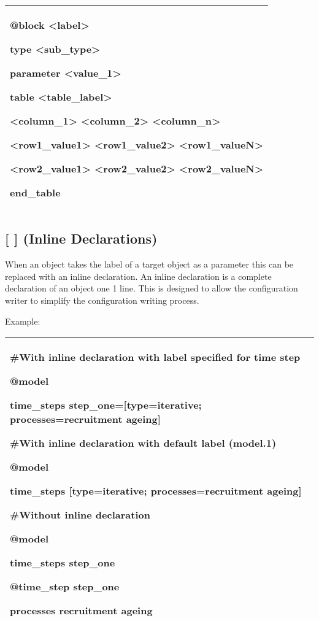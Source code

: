 \documentclass[a4paper,11pt,twoside,pdftex,draft]{article}
\begin{document}
\begin{longtable}[]{@{}l@{}}
\toprule
\endhead
\begin{minipage}[t]{0.97\columnwidth}\raggedright
@block \textless label\textgreater{}

type \textless sub\_type\textgreater{}

parameter \textless value\_1\textgreater{}

table \textless table\_label\textgreater{}

\textless column\_1\textgreater{} \textless column\_2\textgreater{}
\textless column\_n\textgreater{}

\textless row1\_value1\textgreater{}
\textless row1\_value2\textgreater{}
\textless row1\_valueN\textgreater{}

\textless row2\_value1\textgreater{}
\textless row2\_value2\textgreater{}
\textless row2\_valueN\textgreater{}

end\_table\strut
\end{minipage}\tabularnewline
\bottomrule
\end{longtable}

\hypertarget{inline-declarations}{%
\subsection{{[} {]} (Inline Declarations)}\label{inline-declarations}}

When an object takes the label of a target object as a parameter this
can be replaced with an inline declaration. An inline declaration is a
complete declaration of an object one 1 line. This is designed to allow
the configuration writer to simplify the configuration writing process.

Example:

\begin{longtable}[]{@{}l@{}}
\toprule
\endhead
\begin{minipage}[t]{0.97\columnwidth}\raggedright
\#With inline declaration with label specified for time step

@model

time\_steps step\_one={[}type=iterative; processes=recruitment ageing{]}

\#With inline declaration with default label (model.1)

@model

time\_steps {[}type=iterative; processes=recruitment ageing{]}

\#Without inline declaration

@model

time\_steps step\_one

@time\_step step\_one

processes recruitment ageing\strut
\end{minipage}\tabularnewline
\bottomrule
\end{longtable}
\end{document}
